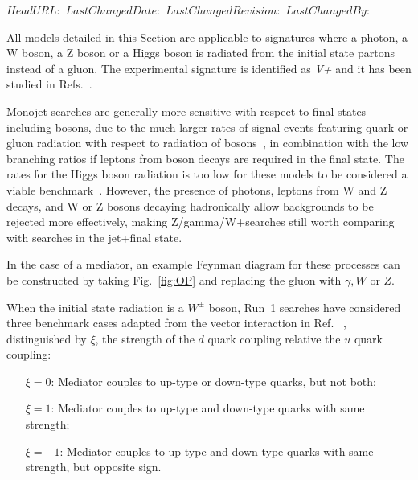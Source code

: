 \svnidlong
{$HeadURL: $}
{$LastChangedDate: $}
{$LastChangedRevision: $}
{$LastChangedBy: $}

All models detailed in this Section are applicable to signatures where 
 a photon, a W boson, a Z boson or a Higgs boson
 is radiated from the initial state partons instead of a gluon. 
The experimental signature is identified as \textit{V+\MET} and it
has been studied in Refs.~\cite{}.


Monojet searches are generally more sensitive
with respect to final states including bosons, due to the much
larger rates of signal events featuring quark or gluon radiation with
respect to radiation of bosons~\cite{Zhou:2013fla},
in combination with the low branching ratios if leptons from
boson decays are required in the final state.
The rates for the Higgs boson radiation is too low for these models
to be considered a viable benchmark~\cite{Carpenter:2013xra}.
However, the presence of photons,
leptons from W and Z decays,
and W or Z bosons decaying hadronically
allow backgrounds to be rejected more effectively,
making Z/gamma/W+\MET searches
still worth comparing with searches in the jet+\MET final state.



In the case of a \spinone mediator,
an example Feynman diagram for these processes can be constructed by taking
Fig.~\ref{fig:OP} and replacing the gluon with $\gamma,W$ or $Z$.

When the initial state radiation is a $W^\pm$ boson, Run~1 searches have considered three benchmark cases adapted from the vector interaction in Ref. ~\cite{Bai:2012xg}, distinguished by $\xi$, the strength of the $d$ quark coupling relative the $u$ quark coupling:
\begin{itemize}
 \item[$\xi=0$:] Mediator couples to up-type or down-type quarks, but not both;
 \item[$\xi=1$:] Mediator couples to up-type and down-type quarks with same strength;
 \item[$\xi=-1$:] Mediator couples to up-type and down-type quarks with same strength, but opposite sign.
\end{itemize}

